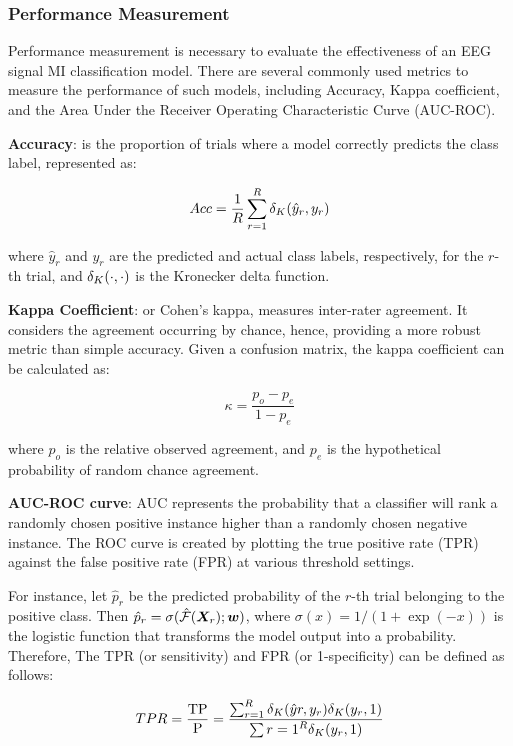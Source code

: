 \subsubsection{Performance Measurement}

Performance measurement is necessary to evaluate the effectiveness of an EEG signal MI classification model. There are several commonly used metrics to measure the performance of such models, including Accuracy, Kappa coefficient, and the Area Under the Receiver Operating Characteristic Curve (AUC-ROC).

\textbf{Accuracy}: is the proportion of trials where a model correctly predicts the class label, represented as:

\begin{equation}
Acc = \frac{1}{R} \sum_{r=1}^{R} \delta_{K}( \hat{y}_r , y_r )
\end{equation}


where $\hat{y}_r$ and $y_r$ are the predicted and actual class labels, respectively, for the $r$-th trial, and $\delta_{K}( \cdot , \cdot )$ is the Kronecker delta function.

\textbf{Kappa Coefficient}: or Cohen’s kappa, measures inter-rater agreement. It considers the agreement occurring by chance, hence, providing a more robust metric than simple accuracy. Given a confusion matrix, the kappa coefficient can be calculated as:

\begin{equation}
\kappa = \frac{p_o - p_e}{1 - p_e}    
\end{equation}

where $p_o$ is the relative observed agreement, and $p_e$ is the hypothetical probability of random chance agreement.

\textbf{AUC-ROC curve}: AUC represents the probability that a classifier will rank a randomly chosen positive instance higher than a randomly chosen negative instance. The ROC curve is created by plotting the true positive rate (TPR) against the false positive rate (FPR) at various threshold settings.

For instance, let $\hat{p}_r$ be the predicted probability of the $r$-th trial belonging to the positive class. Then $\hat{p}_r = \sigma(\hat{\mathcal {F}}(\bm {X}_r); \bm {w})$, where $\sigma(x) = 1/(1 + \exp(-x))$ is the logistic function that transforms the model output into a probability. Therefore, The TPR (or sensitivity) and FPR (or 1-specificity) can be defined as follows:

\begin{equation}
    TPR = \frac{\text{TP}}{\text{P}} = \frac{\sum_{r=1}^{R} \delta_{K}( \hat{y}r ,  y_r )\delta_{K}( y_r , 1 )}{\sum{r=1}^{R} \delta_{K}( y_r , 1 )}    
\end{equation}

